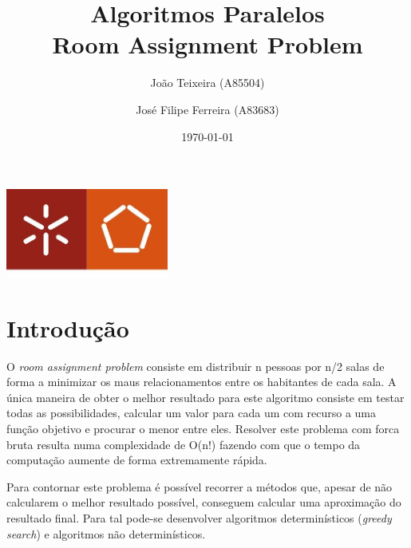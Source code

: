 \documentclass[a4paper]{report}
\begin{document}
\title{Algoritmos Paralelos\\Room Assignment Problem}
\author{João Teixeira (A85504) \and José Filipe Ferreira (A83683)}
\date{\today}

\begin{center}
    \begin{minipage}{0.75\linewidth}
        \centering
        \includegraphics[width=0.4\textwidth]{images/eng.jpeg}\par\vspace{1cm}
        \vspace{1.5cm}
        \href{https://www.uminho.pt/PT}
        {\color{black}{\scshape\LARGE Universidade do Minho}} \par
        \vspace{1cm}
        \href{https://www.di.uminho.pt/}
        {\color{black}{\scshape\Large Departamento de Informática}} \par
        \vspace{1.5cm}
        \maketitle
    \end{minipage}
\end{center}

\tableofcontents

\pagebreak

\chapter{Introdução}
O \textit{room assignment problem} consiste em distribuir n pessoas por n/2
salas de forma a minimizar os maus relacionamentos entre os habitantes de cada
sala. A única maneira de obter o melhor resultado para este algoritmo consiste
em testar todas as possibilidades, calcular um valor para cada um com recurso a
uma função objetivo e procurar o menor entre eles. Resolver este problema com
forca bruta resulta numa complexidade de O(n!) fazendo com que o tempo da
computação aumente de forma extremamente rápida.

Para contornar este problema é possível recorrer a métodos que, apesar de não
calcularem o melhor resultado possível, conseguem calcular uma aproximação do
resultado final. Para tal pode-se desenvolver algoritmos determinísticos
(\textit{greedy search}) e algoritmos não determinísticos.
\end{document}
